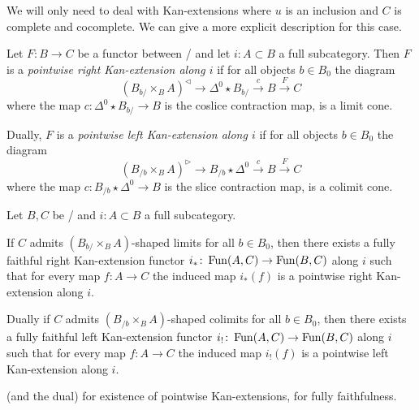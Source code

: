 We will only need to deal with Kan-extensions where $u$ is an inclusion and $C$ is complete and cocomplete.
We can give a more explicit description for this case.
\begin{definition}\label{def:ptwiseKanExt} %
    Let $F\colon B\to C$ be a functor between \inftycats/ and let $i\colon A\subset B$ a full subcategory.
    Then $F$ is a \emph{pointwise right Kan-extension along $i$} if for all objects $b\in B_0$ the diagram
    \begin{equation*}
        \left(B_{b/}\times_B A\right)^{\lhd}\to \Delta^0\star B_{b/}\xrightarrow{c} B\xrightarrow{F} C
    \end{equation*}
    where the map $c\colon\Delta^0\star B_{b/}\to B$ is the coslice contraction map, is a limit cone.

    Dually, $F$ is a \emph{pointwise left Kan-extension along $i$} if for all objects $b\in B_0$ the diagram
    \begin{equation*}
        \left(B_{/b}\times_B A\right)^{\rhd}\to B_{/b}\star\Delta^0 \xrightarrow{c} B\xrightarrow{F} C
    \end{equation*}
    where the map $c\colon B_{/b}\star\Delta^0\to B$ is the slice contraction map, is a colimit cone.
\end{definition}
\begin{prop}\label{prop:exKanExt}
    Let $B,C$ be \inftycats/ and $i\colon A\subset B$ a full subcategory.
    
    If $C$ admits $\left(B_{b/}\times_B A\right)$-shaped limits for all $b\in B_0$, then there exists a fully faithful right Kan-extension functor $i_*\colon\operatorname{Fun}(A,C)\to\operatorname{Fun}(B,C)$ along $i$ such that for every map $f\colon A\to C$ the induced map $i_*(f)$ is a pointwise right Kan-extension along $i$.

    Dually if $C$ admits $\left(B_{/b}\times_B A\right)$-shaped colimits for all $b\in B_0$, then there exists a fully faithful left Kan-extension functor $i_!\colon\operatorname{Fun}(A,C)\to\operatorname{Fun}(B,C)$ along $i$ such that for every map $f\colon A\to C$ the induced map $i_!(f)$ is a pointwise left Kan-extension along $i$.
    \begin{reference}
        \cite[Proposition 6.4.9]{cisinski_2019} (and the dual) for existence of pointwise Kan-extensions, \cite[Corollary 7.3.1.16]{kerodon} for fully faithfulness.
    \end{reference}
\end{prop}